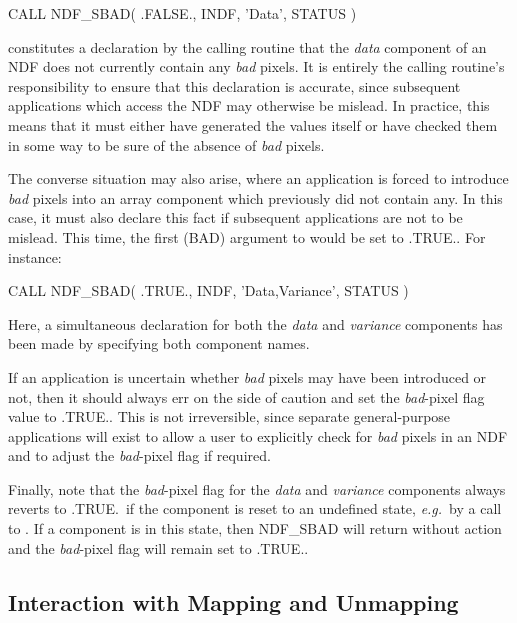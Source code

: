 \documentclass[twoside,11pt,nolof]{starlink}
\providecommand{\st}[1]{{\emph{#1}}}
\begin{document}
\small
\begin{terminalv}
      CALL NDF_SBAD( .FALSE., INDF, 'Data', STATUS )
\end{terminalv}
\normalsize

constitutes a declaration by the calling routine that the \st{data\/} component
of an NDF does not currently contain any \st{bad\/} pixels.
It is entirely the calling routine's responsibility to ensure that this
declaration is accurate, since subsequent applications which access the NDF may
otherwise be mislead.
In practice, this means that it must either have generated the values itself
or have checked them in some way to be sure of the absence of \st{bad\/}
pixels.

The converse situation may also arise, where an application is forced to
introduce \st{bad\/} pixels into an array component which previously did not
contain any.
In this case, it must also declare this fact if subsequent applications are not
to be mislead.
This time, the first (BAD) argument to  would be set to .TRUE..
For instance:

\small
\begin{terminalv}
      CALL NDF_SBAD( .TRUE., INDF, 'Data,Variance', STATUS )
\end{terminalv}
\normalsize

Here, a simultaneous declaration for both the \st{data\/} and \st{variance\/}
components has been made by specifying both component names.

If an application is uncertain whether \st{bad\/} pixels may have been
introduced or not, then it should always err on the side of caution and set the
\st{bad\/}-pixel flag value to .TRUE..
This is not irreversible, since separate general-purpose applications will
exist to allow a user to explicitly check for \st{bad\/} pixels in an NDF and
to adjust the \st{bad\/}-pixel flag if required.

Finally, note that the \st{bad\/}-pixel flag for the \st{data\/} and
\st{variance\/} components always reverts to .TRUE.\ if the component
is reset to
an undefined state, \st{e.g.}\ by a call to .
If a component is in this state, then NDF\_SBAD will return without action
and the \st{bad\/}-pixel flag will remain set to .TRUE..

\subsection{\label{ss:mappinginteract}Interaction with Mapping and Unmapping}
\end{document}
